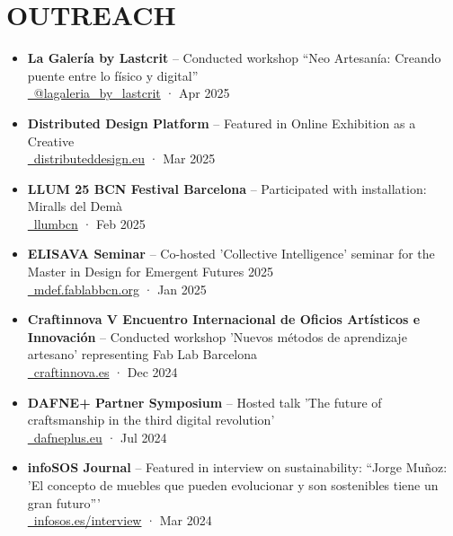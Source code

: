 \documentclass[11pt,a4paper]{article}
\begin{document}
\section*{OUTREACH}
\begin{itemize}[leftmargin=*,label={},itemsep=2pt]
    \item \textbf{La Galería by Lastcrit} -- Conducted workshop ``Neo Artesanía: Creando puente entre lo físico y digital''\\
    \href{https://www.instagram.com/lagaleria_by_lastcrit/}{\faInstagram\ @lagaleria\_by\_lastcrit} · Apr 2025
    
    \item \textbf{Distributed Design Platform} -- Featured in Online Exhibition as a Creative\\
    \href{https://distributeddesign.eu/}{\faLink\ distributeddesign.eu} · Mar 2025
    
    \item \textbf{LLUM 25 BCN Festival Barcelona} -- Participated with installation: Miralls del Demà\\
    \href{https://www.barcelona.cat/llumbcn/ca}{\faGlobe\ llumbcn} · Feb 2025
    
    \item \textbf{ELISAVA Seminar} -- Co-hosted 'Collective Intelligence' seminar for the Master in Design for Emergent Futures 2025\\
    \href{https://mdef.fablabbcn.org/}{\faUniversity\ mdef.fablabbcn.org} · Jan 2025
    
    \item \textbf{Craftinnova V Encuentro Internacional de Oficios Artísticos e Innovación} -- Conducted workshop 'Nuevos métodos de aprendizaje artesano' representing Fab Lab Barcelona\\
    \href{https://www.craftinnova.es/}{\faGlobe\ craftinnova.es} · Dec 2024
    
    \item \textbf{DAFNE+ Partner Symposium} -- Hosted talk 'The future of craftsmanship in the third digital revolution'\\
    \href{https://dafneplus.eu/}{\faGlobe\ dafneplus.eu} · Jul 2024
    
    \item \textbf{infoSOS Journal} -- Featured in interview on sustainability: ``Jorge Muñoz: 'El concepto de muebles que pueden evolucionar y son sostenibles tiene un gran futuro'''\\
    \href{https://infosos.es/jorge-munoz-el-concepto-de-muebles-que-pueden-evolucionar-y-son-sostenibles-tiene-un-gran-futuro/}{\faNewspaper[regular]\ infosos.es/interview} · Mar 2024
    

\end{itemize}
\end{document}
